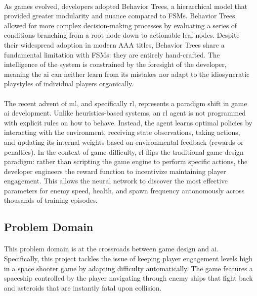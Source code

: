 \paragraph{} As games evolved, developers adopted Behavior Trees, a hierarchical model that provided greater modularity and nuance compared to FSMs. Behavior Trees allowed for more complex decision-making processes by evaluating a series of conditions branching from a root node down to actionable leaf nodes. Despite their widespread adoption in modern AAA titles, Behavior Trees share a fundamental limitation with FSMs: they are entirely hand-crafted. The intelligence of the system is constrained by the foresight of the developer, meaning the \ac{ai} can neither learn from its mistakes nor adapt to the idiosyncratic playstyles of individual players organically.
\paragraph{} The recent advent of \ac{ml}, and specifically \ac{rl}, represents a paradigm shift in game \ac{ai} development. Unlike heuristics-based systems, an \ac{rl} agent is not programmed with explicit rules on how to behave. Instead, the agent learns optimal policies by interacting with the environment, receiving state observations, taking actions, and updating its internal weights based on environmental feedback (rewards or penalties). In the context of game difficulty, \ac{rl} flips the traditional game design paradigm: rather than scripting the game engine to perform specific actions, the developer engineers the reward function to incentivize maintaining player engagement. This allows the neural network to discover the most effective parameters for enemy speed, health, and spawn frequency autonomously across thousands of training episodes.

\subsection{Problem Domain}
\paragraph{} This problem domain is at the crossroads between game design and \ac{ai}. Specifically, this project tackles the issue of keeping player engagement levels high in a space shooter game by adapting difficulty automatically. The game features a spaceship controlled by the player navigating through enemy ships that fight back and asteroids that are instantly fatal upon collision.

